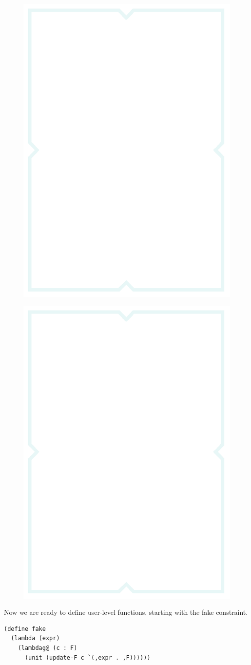 \begin{figure}[h]
    \centering
    \begin{minipage}{.5\textwidth}
        \includegraphics[width=.5\textwidth]{figures/coverbg.png}
        \label{miniS}
    \end{minipage}%
    \begin{minipage}{.5\textwidth}
        \includegraphics[width=.5\textwidth]{figures/coverbg.png}
        \label{staticS}
    \end{minipage}
\end{figure}

Now we are ready to define user-level functions, starting with the fake constraint.
\begin{lstlisting}
(define fake
  (lambda (expr)
    (lambdag@ (c : F)
      (unit (update-F c `(,expr . ,F))))))
\end{lstlisting}

